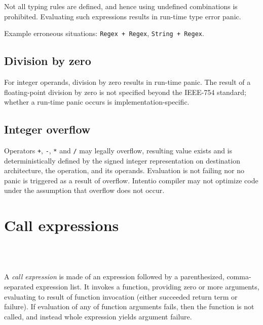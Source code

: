 Not all typing rules are defined, and hence using undefined combinations is prohibited. Evaluating such expressions results in run-time type error panic.

Example erroneous situations: \lstinline{Regex + Regex}, \lstinline{String + Regex}.

\subsection{Division by zero}

For integer operands, division by zero results in run-time panic. The result of a floating-point division by zero is not specified beyond the IEEE-754\cite{IEEE754} standard; whether a run-time panic occurs is implementation-specific.

\subsection{Integer overflow}

Operators \lstinline{+}, \lstinline{-}, \lstinline{*} and \lstinline{/} may legally overflow, resulting value exists and is deterministically defined by the signed integer representation on destination architecture, the operation, and its operands. Evaluation is not failing nor no panic is triggered as a result of overflow. Intentio compiler may not optimize code under the assumption that overflow does not occur.

\section{Call expressions}

\begin{bnf}
   \eq {} \ \term{(} \  \ \term{)} \\
   \eq {} \  \  \ \gtry{\term{,}}
\end{bnf}

A \emph{call expression} is made of an expression followed by a parenthesized, comma-separated expression list. It invokes a function, providing zero or more arguments, evaluating to result of function invocation (either succeeded return term or failure). If evaluation of any of function arguments fails, then the function is not called, and instead whole expression yields argument failure.

